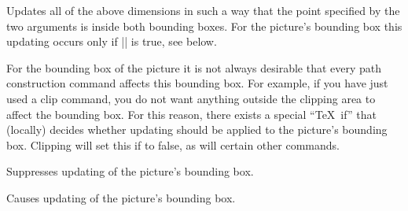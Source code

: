\begin{command}{\pgf@protocolsizes{}}
    Updates all of the above dimensions in such a way that the point specified
    by the two arguments is inside both bounding boxes. For the picture's
    bounding box this updating occurs only if |\ifpgf@relevantforpicturesize|
    is true, see below.
\end{command}

For the bounding box of the picture it is not always desirable that every path
construction command affects this bounding box. For example, if you have just
used a clip command, you do not want anything outside the clipping area to
affect the bounding box. For this reason, there exists a special ``\TeX\ if''
that (locally) decides whether updating should be applied to the picture's
bounding box. Clipping will set this if to false, as will certain other
commands.

\begin{command}{\pgf@relevantforpicturesizefalse}
    Suppresses updating of the picture's bounding box.
\end{command}

\begin{command}{\pgf@relevantforpicturesizetrue}
    Causes updating of the picture's bounding box.
\end{command}
